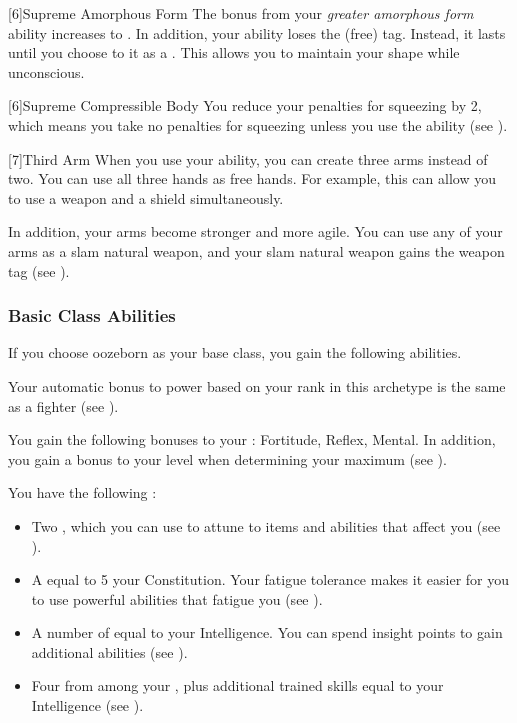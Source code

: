             [6]{Supreme Amorphous Form} The bonus from your \textit{greater amorphous form} ability increases to .
            In addition, your  ability loses the  (free) tag.
            Instead, it lasts until you choose to  it as a .
            This allows you to maintain your shape while unconscious.

            [6]{Supreme Compressible Body} You reduce your penalties for squeezing by 2, which means you take no penalties for squeezing unless you use the  ability (see ).

            [7]{Third Arm} When you use your  ability, you can create three arms instead of two.
            You can use all three hands as free hands.
            For example, this can allow you to use a  weapon and a shield simultaneously.

            In addition, your arms become stronger and more agile.
            You can use any of your arms as a slam natural weapon, and your slam natural weapon gains the  weapon tag (see ).

        \subsubsection{Basic Class Abilities}
            If you choose oozeborn as your base class, you gain the following abilities.

             Your automatic bonus to power based on your rank in this archetype is the same as a fighter (see ).

            You gain the following bonuses to your :  Fortitude,  Reflex,  Mental.
            In addition, you gain a  bonus to your level when determining your maximum  (see ).

             You have the following :
            \begin{itemize}
                \item Two , which you can use to attune to items and abilities that affect you (see ).
                \item A  equal to 5 \add your Constitution.
                    Your fatigue tolerance makes it easier for you to use powerful abilities that fatigue you (see ).
                \item A number of  equal to your Intelligence.
                    You can spend insight points to gain additional abilities (see ).
                \item Four  from among your , plus additional trained skills equal to your Intelligence (see ).
            \end{itemize}


